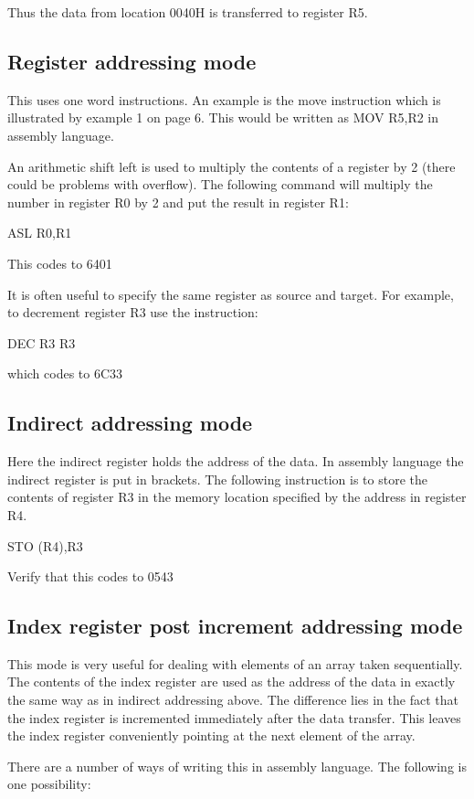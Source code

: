 \documentclass{article}
\begin{document}
Thus the data from location 0040H is transferred to register R5.

\subsection{Register addressing mode}

This uses one word instructions. An example is the move instruction which is illustrated by example 1 on page 6. This would be written as MOV R5,R2 in assembly language.

An arithmetic shift left is used to multiply the contents of a register by 2 (there could be problems with overflow). The following command will multiply the number in register R0 by 2 and put the result in register R1:

\qquad ASL R0,R1

This codes to 6401

It is often useful to specify the same register as source and target. For example, to decrement register R3 use the instruction:

\qquad DEC R3 R3

which codes to 6C33

\subsection{Indirect addressing mode}

Here the indirect register holds the address of the data. In assembly language the indirect register is put in brackets. The following instruction is to store the contents of register R3 in the memory location specified by the address in register R4.

\qquad STO (R4),R3

Verify that this codes to 0543

\subsection{Index register post increment addressing mode}

This mode is very useful for dealing with elements of an array taken sequentially. The contents of the index register are used as the address of the data in exactly the same way as in indirect addressing above. The difference lies in the fact that the index register is incremented immediately after the data transfer. This leaves the index register conveniently pointing at the next element of the array.

There are a number of ways of writing this in assembly language. The following is one possibility:
\end{document}
